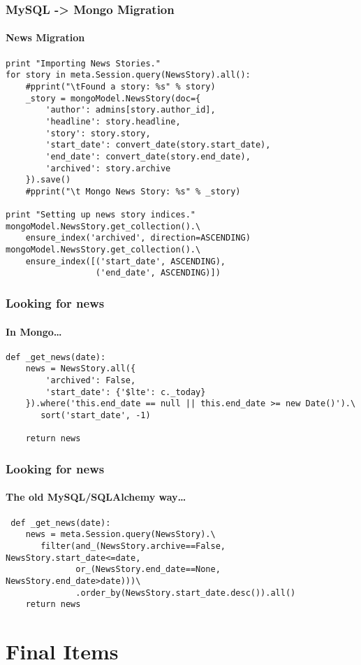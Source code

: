 \documentclass{beamer}
\begin{document}
\begin{frame}[fragile]
\frametitle{MySQL -> Mongo Migration}
\framesubtitle{News Migration}
\begin{lstlisting}
print "Importing News Stories."
for story in meta.Session.query(NewsStory).all():
    #pprint("\tFound a story: %s" % story)
    _story = mongoModel.NewsStory(doc={
        'author': admins[story.author_id],
        'headline': story.headline,
        'story': story.story,
        'start_date': convert_date(story.start_date),
        'end_date': convert_date(story.end_date),
        'archived': story.archive
    }).save()
    #pprint("\t Mongo News Story: %s" % _story)

print "Setting up news story indices."
mongoModel.NewsStory.get_collection().\
    ensure_index('archived', direction=ASCENDING)
mongoModel.NewsStory.get_collection().\
    ensure_index([('start_date', ASCENDING), 
				  ('end_date', ASCENDING)])
\end{lstlisting}
\end{frame}

\begin{frame}[fragile]
\frametitle{Looking for news}
\framesubtitle{In Mongo\dots}
\begin{lstlisting}
def _get_news(date):
    news = NewsStory.all({
        'archived': False,
        'start_date': {'$lte': c._today}
    }).where('this.end_date == null || this.end_date >= new Date()').\
       sort('start_date', -1) 
    
    return news
\end{lstlisting}
\end{frame}


\begin{frame}[fragile]
\frametitle{Looking for news}
\framesubtitle{The old MySQL/SQLAlchemy way\dots}
\begin{lstlisting}
 def _get_news(date):
    news = meta.Session.query(NewsStory).\
       filter(and_(NewsStory.archive==False, NewsStory.start_date<=date,
              or_(NewsStory.end_date==None, NewsStory.end_date>date)))\
              .order_by(NewsStory.start_date.desc()).all()
	return news
\end{lstlisting}
\end{frame}

\section{Final Items}
\end{document}
